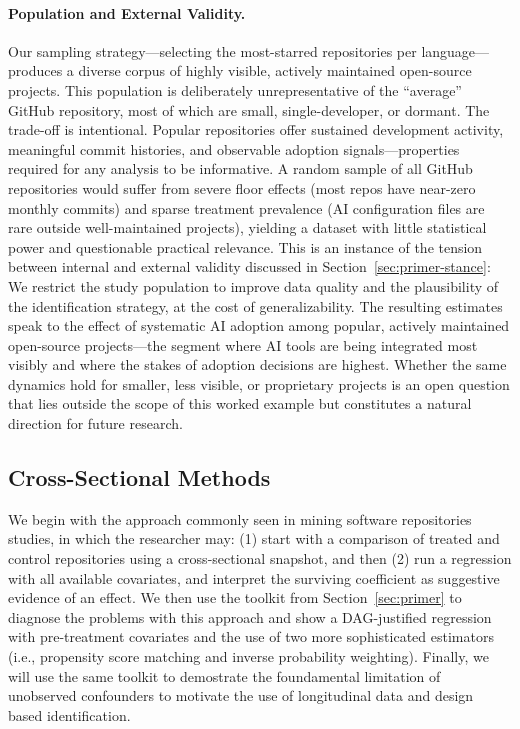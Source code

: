 \paragraph{Population and External Validity.}
Our sampling strategy---selecting the most-starred repositories per language---produces a diverse corpus of highly visible, actively maintained open-source projects.
This population is deliberately unrepresentative of the ``average'' GitHub repository, most of which are small, single-developer, or dormant.
The trade-off is intentional.
Popular repositories offer sustained development activity, meaningful commit histories, and observable adoption signals---properties required for any analysis to be informative.
A random sample of all GitHub repositories would suffer from severe floor effects (most repos have near-zero monthly commits) and sparse treatment prevalence (AI configuration files are rare outside well-maintained projects), yielding a dataset with little statistical power and questionable practical relevance.
This is an instance of the tension between internal and external validity discussed in Section~\ref{sec:primer-stance}: We restrict the study population to improve data quality and the plausibility of the identification strategy, at the cost of generalizability.
The resulting estimates speak to the effect of systematic AI adoption among popular, actively maintained open-source projects---the segment where AI tools are being integrated most visibly and where the stakes of adoption decisions are highest.
Whether the same dynamics hold for smaller, less visible, or proprietary projects is an open question that lies outside the scope of this worked example but constitutes a natural direction for future research.

\subsection{Cross-Sectional Methods}
\label{sec:cross-sectional}

We begin with the approach commonly seen in mining software repositories studies, in which the researcher may: (1) start with a comparison of treated and control repositories using a cross-sectional snapshot, and then (2) run a regression with all available covariates, and interpret the surviving coefficient as suggestive evidence of an effect.
We then use the toolkit from Section~\ref{sec:primer} to diagnose the problems with this approach and show a DAG-justified regression with pre-treatment covariates and the use of two more sophisticated estimators (i.e., propensity score matching and inverse probability weighting).
Finally, we will use the same toolkit to demostrate the foundamental limitation of unobserved confounders to motivate the use of longitudinal data and design based identification.


